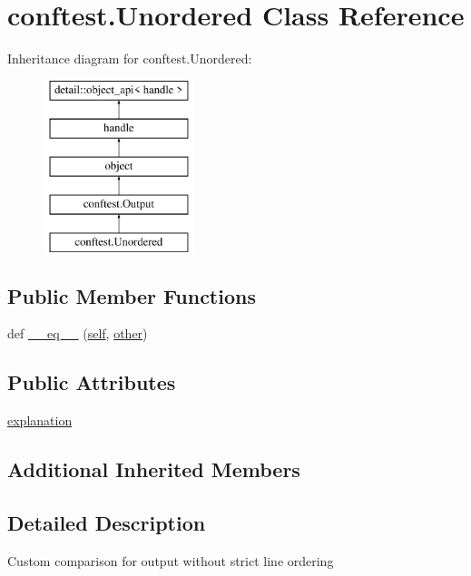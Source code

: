 \hypertarget{classconftest_1_1_unordered}{}\section{conftest.\+Unordered Class Reference}
\label{classconftest_1_1_unordered}
Inheritance diagram for conftest.\+Unordered\+:\begin{figure}[H]
\begin{center}
\leavevmode
\includegraphics[height=5.000000cm]{classconftest_1_1_unordered}
\end{center}
\end{figure}
\subsection*{Public Member Functions}
\begin{DoxyCompactItemize}
\item 
def \mbox{\hyperlink{classconftest_1_1_unordered_a51a62b504cc6d896bb863a8badcd1fdf}{\+\_\+\+\_\+eq\+\_\+\+\_\+}} (\mbox{\hyperlink{modsupport_8h_a0180ca1808366e5da641475e8bf8cca3}{self}}, \mbox{\hyperlink{dictobject_8h_abd4733e17e86acb453bda62bc8b96adf}{other}})
\end{DoxyCompactItemize}
\subsection*{Public Attributes}
\begin{DoxyCompactItemize}
\item 
\mbox{\hyperlink{classconftest_1_1_unordered_abd5e38f442dadce7c2f2e7ed059557e4}{explanation}}
\end{DoxyCompactItemize}
\subsection*{Additional Inherited Members}


\subsection{Detailed Description}
\begin{DoxyVerb}Custom comparison for output without strict line ordering\end{DoxyVerb}
 

